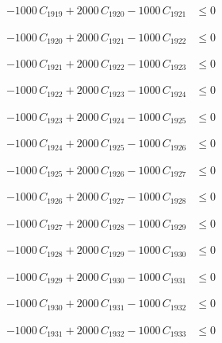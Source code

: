 \documentclass[a4paper,11pt]{article}
\begin{document}
\begin{align}
-1000\,C_{1919} + 2000\,C_{1920} - 1000\,C_{1921} &\leq 0 \nonumber
\end{align}

\begin{align}
-1000\,C_{1920} + 2000\,C_{1921} - 1000\,C_{1922} &\leq 0 \nonumber
\end{align}

\begin{align}
-1000\,C_{1921} + 2000\,C_{1922} - 1000\,C_{1923} &\leq 0 \nonumber
\end{align}

\begin{align}
-1000\,C_{1922} + 2000\,C_{1923} - 1000\,C_{1924} &\leq 0 \nonumber
\end{align}

\begin{align}
-1000\,C_{1923} + 2000\,C_{1924} - 1000\,C_{1925} &\leq 0 \nonumber
\end{align}

\begin{align}
-1000\,C_{1924} + 2000\,C_{1925} - 1000\,C_{1926} &\leq 0 \nonumber
\end{align}

\begin{align}
-1000\,C_{1925} + 2000\,C_{1926} - 1000\,C_{1927} &\leq 0 \nonumber
\end{align}

\begin{align}
-1000\,C_{1926} + 2000\,C_{1927} - 1000\,C_{1928} &\leq 0 \nonumber
\end{align}

\begin{align}
-1000\,C_{1927} + 2000\,C_{1928} - 1000\,C_{1929} &\leq 0 \nonumber
\end{align}

\begin{align}
-1000\,C_{1928} + 2000\,C_{1929} - 1000\,C_{1930} &\leq 0 \nonumber
\end{align}

\begin{align}
-1000\,C_{1929} + 2000\,C_{1930} - 1000\,C_{1931} &\leq 0 \nonumber
\end{align}

\begin{align}
-1000\,C_{1930} + 2000\,C_{1931} - 1000\,C_{1932} &\leq 0 \nonumber
\end{align}

\begin{align}
-1000\,C_{1931} + 2000\,C_{1932} - 1000\,C_{1933} &\leq 0 \nonumber
\end{align}
\end{document}
